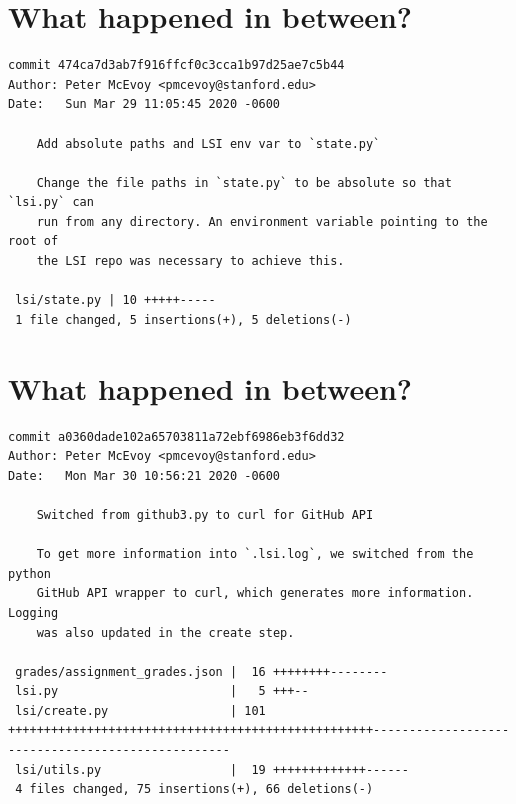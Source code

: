 \documentclass{article}
\begin{document}
\section*{What happened in between?}
\vspace{2ex}
\begin{verbatim}
commit 474ca7d3ab7f916ffcf0c3cca1b97d25ae7c5b44
Author: Peter McEvoy <pmcevoy@stanford.edu>
Date:   Sun Mar 29 11:05:45 2020 -0600

    Add absolute paths and LSI env var to `state.py`
    
    Change the file paths in `state.py` to be absolute so that `lsi.py` can
    run from any directory. An environment variable pointing to the root of
    the LSI repo was necessary to achieve this.

 lsi/state.py | 10 +++++-----
 1 file changed, 5 insertions(+), 5 deletions(-)

\end{verbatim}

\newpage

\section*{What happened in between?}
\vspace{2ex}
\begin{verbatim}
commit a0360dade102a65703811a72ebf6986eb3f6dd32
Author: Peter McEvoy <pmcevoy@stanford.edu>
Date:   Mon Mar 30 10:56:21 2020 -0600

    Switched from github3.py to curl for GitHub API
    
    To get more information into `.lsi.log`, we switched from the python
    GitHub API wrapper to curl, which generates more information. Logging
    was also updated in the create step.

 grades/assignment_grades.json |  16 ++++++++--------
 lsi.py                        |   5 +++--
 lsi/create.py                 | 101 +++++++++++++++++++++++++++++++++++++++++++++++++++--------------------------------------------------
 lsi/utils.py                  |  19 +++++++++++++------
 4 files changed, 75 insertions(+), 66 deletions(-)

\end{verbatim}

\newpage
\end{document}
